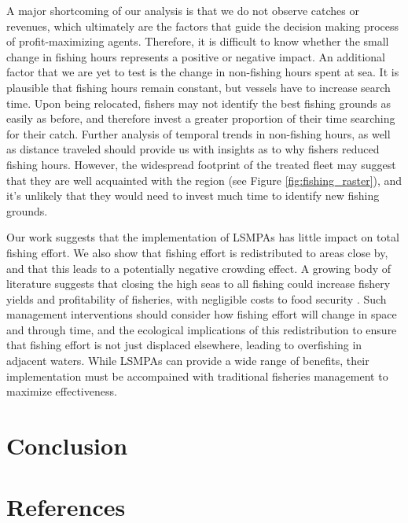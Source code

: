 \documentclass[9p,twocolumn,twoside,lineno]{pnas-new}
\begin{document}
A major shortcoming of our analysis is that we do not observe catches or
revenues, which ultimately are the factors that guide the decision
making process of profit-maximizing agents. Therefore, it is difficult
to know whether the small change in fishing hours represents a positive or
negative impact. An additional factor that we are yet to test is the
change in non-fishing hours spent at sea. It is plausible that fishing
hours remain constant, but vessels have to increase search time. Upon
being relocated, fishers may not identify the best fishing grounds as
easily as before, and therefore invest a greater proportion of their
time searching for their catch. Further analysis of temporal trends in
non-fishing hours, as well as distance traveled should provide us with
insights as to why fishers reduced fishing hours. However, the
widespread footprint of the treated fleet may suggest that they are well
acquainted with the region (see Figure \ref{fig:fishing_raster}), and it's
unlikely that they would need to invest much time to identify new fishing grounds.

Our work suggests that the implementation of LSMPAs has little impact on
total fishing effort. We also show that fishing effort is
redistributed to areas close by, and that this leads to a potentially
negative crowding effect. A growing body of literature suggests that
closing the high seas to all fishing could increase fishery yields and
profitability of fisheries, with negligible costs to food security
\citep{white_2014,sumaila_2015,sala_2018a,schiller_2018}. Such
management interventions should consider how fishing effort will change
in space and through time, and the ecological implications of this
redistribution to ensure that fishing effort is not just displaced
elsewhere, leading to overfishing in adjacent waters. While LSMPAs can
provide a wide range of benefits, their implementation must be
accompained with traditional fisheries management to maximize
effectiveness.

\section{Conclusion}\label{conclude}

\clearpage

\section{References}\label{references}


\end{document}
